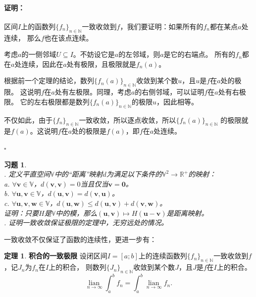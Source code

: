\documentclass[12pt,UTF8]{ctexbook}
\newcommand{\lian}[1]{
    \underset{#1}{\operatorname{lian}\,}
}
\theoremstyle{definition}
\newtheorem{tm}{定理}[section]
\theoremstyle{plain}
\newtheorem{xt}{习题}[section]
\renewenvironment{proof}{\paragraph{\textbf{证明：}}}{\hfill$\square$}
\begin{document}
\begin{appendix}
\begin{proof}
    区间$I$上的函数列$\{f_n\}_{n\in\mathbb{N}}$一致收敛到$f$，我们要证明：如果所有的$f_n$都在某点$a$处连续，
    那么$f$也在该点连续。

    考虑$a$的一侧邻域$U\subseteq I$。不妨设它是$a$的左邻域，则$a$是它的右端点。
    所有的$f_n$都在$a$处连续，因此在$a$处有极限，且极限就是$f_n(a)$。

    根据前一个定理的结论，数列$\{f_n(a)\}_{n\in\mathbb{N}}$收敛到某个数$u$，且$u$是$f$在$a$处的极限。
    这说明$f$在$a$处有左极限。同理，考虑$a$的右侧邻域，可以证明$f$在$a$处有右极限。
    它的左右极限都是数列$\{f_n(a)\}_{n\in\mathbb{N}}$的极限$u$，因此相等。
    
    不仅如此，由于$\{f_n\}_{n\in\mathbb{N}}$一致收敛，所以逐点收敛，所以$\{f_n(a)\}_{n\in\mathbb{N}}$
    的极限就是$f(a)$。这说明$f$在$a$处的极限是$f(a)$，即$f$在$a$处连续。

\end{proof}

\begin{xt}
    \mbox{} \\
    . 定义平直空间$\mathbb{V}$中的“距离”映射$d$为满足以下条件的$\mathbb{V}^2 \rightarrow \mathbb{R}^+$的映射：\\
    \indent \indent a. $\forall \mathbf{v} \in \mathbb{V}$，$d(\mathbf{v}, \mathbf{v}) = 0$当且仅当$\mathbf{v} = \mathbf{0}$。\\
    \indent \indent b. $\forall \mathbf{u}, \mathbf{v} \in \mathbb{V}$，$d(\mathbf{u}, \mathbf{v}) = d(\mathbf{v}, \mathbf{u})$。\\
    \indent \indent c. $\forall \mathbf{u}, \mathbf{v}, \mathbf{w} \in \mathbb{V}$，$d(\mathbf{u}, \mathbf{w}) \leqslant d(\mathbf{u}, \mathbf{v}) + d(\mathbf{v}, \mathbf{w})$。\\
    \indent 证明：只要$H$是$\mathbb{V}$中的模，那么$(\mathbf{u}, \mathbf{v})\mapsto H(\mathbf{u} - \mathbf{v})$是距离映射。\\
    . 证明一致收敛保证极限的定理中，无穷远处的情况。
\end{xt}

一致收敛不仅保证了函数的连续性，更进一步有：

\begin{tm}{\textbf{积合的一致极限}}
    设闭区间$I=[a;b]$上的连续函数列$\{f_n\}_{n\in\mathbb{N}}$一致收敛到$f$，记$J_n$为$f_n$在$I$上的积合，
    则数列$\{J_n\}_{n\in\mathbb{N}}$收敛到某个数$J$，且$J$是$f$在$I$上的积合。
    $$ \lian{n\to \infty} \int_a^b f_n = \int_a^b \lian{n\to\infty} f_n. $$
\end{tm}


\end{appendix}
\end{document}
